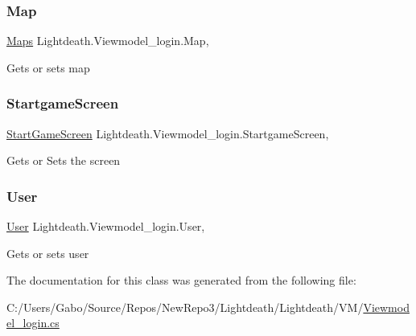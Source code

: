 \subsubsection{\texorpdfstring{Map}{Map}}
{\footnotesize\ttfamily \hyperlink{class_lightdeath_1_1_maps}{Maps} Lightdeath.\+Viewmodel\+\_\+login.\+Map\hspace{0.3cm}{\ttfamily [get]}, {\ttfamily [set]}}



Gets or sets map 

\hypertarget{class_lightdeath_1_1_viewmodel__login_abc617f5e0bb63db9eb6f04dff22d6bbf}{}\label{class_lightdeath_1_1_viewmodel__login_abc617f5e0bb63db9eb6f04dff22d6bbf} 
\subsubsection{\texorpdfstring{Startgame\+Screen}{StartgameScreen}}
{\footnotesize\ttfamily \hyperlink{class_lightdeath_1_1_start_game_screen}{Start\+Game\+Screen} Lightdeath.\+Viewmodel\+\_\+login.\+Startgame\+Screen\hspace{0.3cm}{\ttfamily [get]}, {\ttfamily [set]}}



Gets or Sets the screen 

\hypertarget{class_lightdeath_1_1_viewmodel__login_a0636f3452aa3b6294a23ba4fb1319cfa}{}\label{class_lightdeath_1_1_viewmodel__login_a0636f3452aa3b6294a23ba4fb1319cfa} 
\subsubsection{\texorpdfstring{User}{User}}
{\footnotesize\ttfamily \hyperlink{class_lightdeath_1_1_user}{User} Lightdeath.\+Viewmodel\+\_\+login.\+User\hspace{0.3cm}{\ttfamily [get]}, {\ttfamily [set]}}



Gets or sets user 



The documentation for this class was generated from the following file\+:\begin{DoxyCompactItemize}
\item 
C\+:/\+Users/\+Gabo/\+Source/\+Repos/\+New\+Repo3/\+Lightdeath/\+Lightdeath/\+V\+M/\hyperlink{_viewmodel__login_8cs}{Viewmodel\+\_\+login.\+cs}\end{DoxyCompactItemize}
